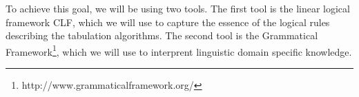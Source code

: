 To achieve this goal, we will be using two tools. The first tool is the linear logical framework CLF, which we will use to capture the essence of the logical rules describing the tabulation algorithms. The second tool is the Grammatical Framework\footnote{http://www.grammaticalframework.org/}, which we will use to interprent linguistic domain specific knowledge.